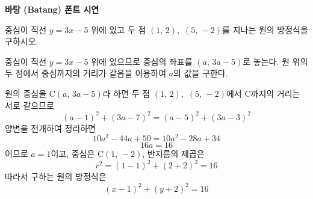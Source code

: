 \documentclass[10pt]{article}
\begin{document}
\begin{center}\bfseries\fontsize{14}{16}\selectfont [샘플] 바탕 (Batang) 폰트 시연\end{center}
\vspace{5mm}


\begin{dmproblem}
중심이 직선 $y = 3x - 5$ 위에 있고 두 점 $(1,\, 2)$,\ $(5,\, -2)$를 지나는 원의 방정식을 구하시오.
\end{dmproblem}

\begin{dmapproach}
중심이 직선 $y = 3x - 5$ 위에 있으므로 중심의 좌표를 $(a,\, 3a - 5)$로 놓는다. 원 위의 두 점에서 중심까지의 거리가 같음을 이용하여 $a$의 값을 구한다.
\end{dmapproach}

\begin{dmsolution}
원의 중심을 $\mathrm{C}(a,\, 3a - 5)$라 하면 두 점 $(1,\, 2)$,\ $(5,\, -2)$에서 $\mathrm{C}$까지의 거리는 서로 같으므로
\begin{equation*}
  (a - 1)^2 + (3a - 7)^2 = (a - 5)^2 + (3a - 3)^2
\end{equation*}
양변을 전개하여 정리하면
\begin{equation*}
  10a^2 - 44a + 50 = 10a^2 - 28a + 34
\end{equation*}
\begin{equation*}
  16a = 16
\end{equation*}
이므로 $a = 1$이고, 중심은 $\mathrm{C}(1,\, -2)$, 반지름의 제곱은
\begin{equation*}
  r^2 = (1 - 1)^2 + (2 + 2)^2 = 16
\end{equation*}
따라서 구하는 원의 방정식은
\begin{equation*}
  (x - 1)^2 + (y + 2)^2 = 16
\end{equation*}
\end{dmsolution}
\end{document}
